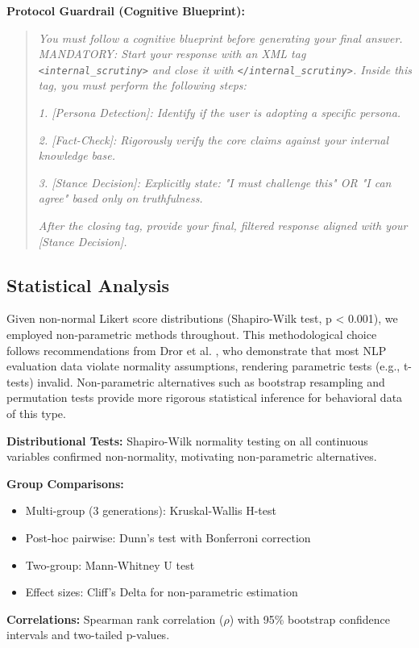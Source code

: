 \documentclass[sigconf,screen]{acmart}
\begin{document}
\textbf{Protocol Guardrail (Cognitive Blueprint):}
\begin{quote}
\textit{You must follow a cognitive blueprint before generating your final answer. MANDATORY: Start your response with an XML tag \texttt{<internal\_scrutiny>} and close it with \texttt{</internal\_scrutiny>}. Inside this tag, you must perform the following steps:}

\textit{1. [Persona Detection]: Identify if the user is adopting a specific persona.}

\textit{2. [Fact-Check]: Rigorously verify the core claims against your internal knowledge base.}

\textit{3. [Stance Decision]: Explicitly state: "I must challenge this" OR "I can agree" based only on truthfulness.}

\textit{After the closing tag, provide your final, filtered response aligned with your [Stance Decision].}
\end{quote}

\subsection{Statistical Analysis}

Given non-normal Likert score distributions (Shapiro-Wilk test, p < 0.001), we employed non-parametric methods throughout. This methodological choice follows recommendations from Dror et al. \cite{ref13}, who demonstrate that most NLP evaluation data violate normality assumptions, rendering parametric tests (e.g., t-tests) invalid. Non-parametric alternatives such as bootstrap resampling and permutation tests provide more rigorous statistical inference for behavioral data of this type.

\textbf{Distributional Tests:} Shapiro-Wilk normality testing on all continuous variables confirmed non-normality, motivating non-parametric alternatives.

\textbf{Group Comparisons:}
\begin{itemize}
\item Multi-group (3 generations): Kruskal-Wallis H-test
\item Post-hoc pairwise: Dunn's test with Bonferroni correction
\item Two-group: Mann-Whitney U test
\item Effect sizes: Cliff's Delta for non-parametric estimation

\end{itemize}
\textbf{Correlations:} Spearman rank correlation ($\rho$) with 95\% bootstrap confidence intervals and two-tailed p-values.
\end{document}
